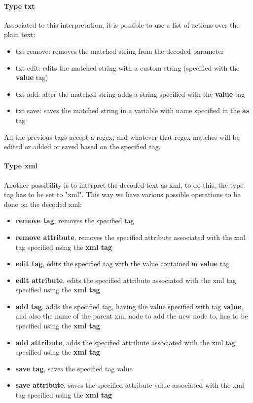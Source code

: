 \paragraph{Type txt}
Associated to this interpretation, it is possible to use a list of actions over the plain text:
\begin{itemize}
    \item txt remove: removes the matched string from the decoded parameter
    \item txt edit: edits the matched string with a custom string (specified with the \textbf{value} tag)
    \item txt add: after the matched string adds a string specified with the \textbf{value} tag
    \item txt save: saves the matched string in a variable with name specified in the \textbf{as} tag
\end{itemize}
All the previous tags accept a regex, and whatever that regex matches will be edited or added or saved based on the specified tag.

\paragraph{Type xml}
Another possibility is to interpret the decoded text as xml, to do this, the type tag has to be set to "xml".
This way we have various possible operations to be done on the decoded xml:
\begin{itemize}
    \item \textbf{remove tag}, removes the specified tag
    \item \textbf{remove attribute}, removes the specified attribute associated with the xml tag specified using the \textbf{xml tag}
    \item \textbf{edit tag}, edits the specified tag with the value contained in \textbf{value} tag 
    \item \textbf{edit attribute}, edits the specified attribute associated with the xml tag specified using the \textbf{xml tag}
    \item \textbf{add tag}, adds the specified tag, having the value specified with tag \textbf{value}, and also the name of the parent xml node to add the new node to, has to be specified using the \textbf{xml tag}
    \item \textbf{add attribute}, adds the specified attribute associated with the xml tag specified using the \textbf{xml tag}
    \item \textbf{save tag}, saves the specified tag value
    \item \textbf{save attribute}, saves the specified attribute value associated with the xml tag specified using the \textbf{xml tag}
\end{itemize}

